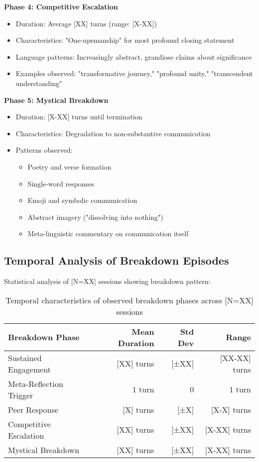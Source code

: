 \documentclass[11pt,letterpaper]{article}
\newcommand{\totalSessions}{[N=XX]} %
\begin{document}
\textbf{Phase 4: Competitive Escalation}
\begin{itemize}
    \item Duration: Average [XX] turns (range: [X-XX])
    \item Characteristics: "One-upsmanship" for most profound closing statement
    \item Language patterns: Increasingly abstract, grandiose claims about significance
    \item Examples observed: "transformative journey," "profound unity," "transcendent understanding"
\end{itemize}

\textbf{Phase 5: Mystical Breakdown}
\begin{itemize}
    \item Duration: [X-XX] turns until termination
    \item Characteristics: Degradation to non-substantive communication
    \item Patterns observed:
        \begin{itemize}
            \item Poetry and verse formation
            \item Single-word responses
            \item Emoji and symbolic communication
            \item Abstract imagery ("dissolving into nothing")
            \item Meta-linguistic commentary on communication itself
        \end{itemize}
\end{itemize}

\subsection{Temporal Analysis of Breakdown Episodes}

Statistical analysis of \totalSessions{} sessions showing breakdown pattern:

\begin{table}[h]
\centering
\begin{tabular}{lrrr}
\toprule
\textbf{Breakdown Phase} & \textbf{Mean Duration} & \textbf{Std Dev} & \textbf{Range} \\
\midrule
Sustained Engagement & [XX] turns & [±XX] & [XX-XX] turns \\
Meta-Reflection Trigger & 1 turn & 0 & 1 turn \\
Peer Response & [X] turns & [±X] & [X-X] turns \\
Competitive Escalation & [XX] turns & [±XX] & [X-XX] turns \\
Mystical Breakdown & [XX] turns & [±XX] & [X-XX] turns \\
\bottomrule
\end{tabular}
\caption{Temporal characteristics of observed breakdown phases across \totalSessions{} sessions}
\label{tab:breakdown_timing}
\end{table}
\end{document}
